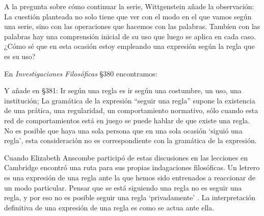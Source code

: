 A la pregunta sobre cómo continuar la serie, Wittgenstein añade la observación:
La cuestión planteada no solo tiene que ver con el modo en el que vamos según
una serie, sino con las operaciones que hacemos con las palabras. Tambíen con
las palabras hay una comprensión inicial de su uso que luego se aplica en cada
caso. ¿Cómo sé que en esta ocasión estoy empleando una expresión según la regla
que es su uso? 

En \emph{Investigaciones Filosóficas} \S380 encontramos:

Y añade en \S381:
Ir según una regla es ir según una costumbre, un uso, una institución;
La gramática de la expresión ``seguir una regla'' supone la existencia de una
prática, una regularidad, un comportamiento normativo, sólo cuando esta red de
comportamientos está en juego se puede hablar de que existe una
regla\autocite[cf.~][p.~14]{rulesngrammar}. No es posible que haya una sola
persona que en una sola ocasión `siguió una regla', esta consideración no es
correspondiente con la gramática de la expresión\autocite[cf.~][p.~87 \S1
199]{PI}.

Cuando Elizabeth Anscombe participó de estas discusiones en las lecciones en
Cambridge encontró una ruta para sus propias indagaciones filosóficas.
Un letrero es una expresión de una regla ante la que hemos sido entrenados a
reaccionar de un modo particular. Pensar que se está siguiendo una regla no es
seguir una regla, y por eso no es posible seguir una regla `privadamente'
\autocite[cf.~][p.87 /S1 202]{PI}. La interpretación definitiva de una expresión
de una regla es como se actua ante ella. 

